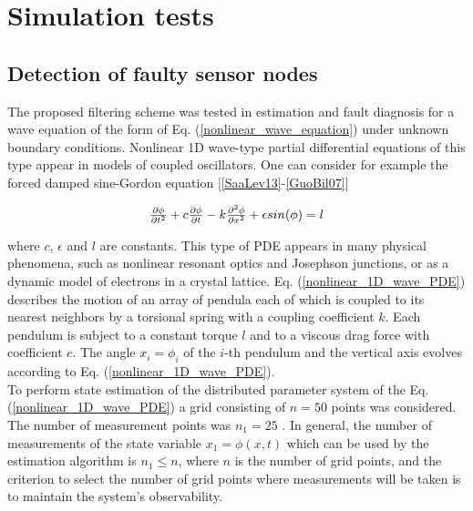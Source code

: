\documentclass[journal]{IEEEtran}
\begin{document}
\section{Simulation tests}  \label{section 6 : Simulation_tests}

\subsection{Detection of faulty sensor nodes}

\noindent The proposed filtering scheme was tested in estimation and fault diagnosis for a wave equation of the form
of Eq. (\ref{nonlinear_wave_equation}) under unknown boundary conditions. Nonlinear 1D wave-type partial differential equations of this type appear in models of coupled oscillators. One can consider for example the forced damped sine-Gordon equation [\ref{SaaLev13}-\ref{GuoBil07}]

\begin{equation} \label{nonlinear_1D_wave_PDE}
\begin{tabular}{c}
${{\partial}{\phi} \over {{\partial}t^2}}+c{{{\partial}{\phi}} \over {{\partial}t}}-k{{\partial}^2{\phi} \over {{\partial}x^2}}+{\epsilon}sin(\phi)=l$
\end{tabular}
\end{equation}

\noindent where $c$, ${\epsilon}$ and $l$ are constants. This type of PDE appears in many physical phenomena, such as nonlinear resonant optics and Josephson junctions, or as a dynamic model of electrons in a crystal lattice. Eq. (\ref{nonlinear_1D_wave_PDE}) describes the motion of an array of pendula each of which is coupled to its nearest neighbors by a torsional spring with a coupling coefficient $k$. Each pendulum is subject to a constant torque $l$
and to a viscous drag force with coefficient $c$. The angle $x_i=\phi_i$ of the $i$-th pendulum and the vertical axis
evolves according to Eq. (\ref{nonlinear_1D_wave_PDE}).\\

\noindent To perform state estimation of the distributed parameter system of the Eq. (\ref{nonlinear_1D_wave_PDE}) a  grid consisting of $n=50$ points was considered. The number of measurement points was $n_1=25$ . In general, the number of measurements of the state variable $x_1=\phi(x,t)$ which can  be used by the estimation algorithm is  $n_1{\leq}n$, where $n$ is the number of grid points, and the criterion to select the number of grid points where measurements will be taken is to maintain the system's observability.  \\
\end{document}
